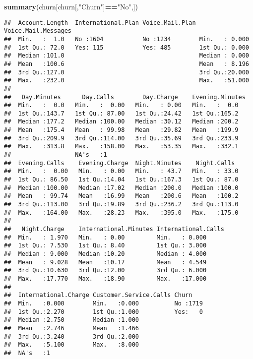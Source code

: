 \documentclass[]{article}
\newenvironment{Shaded}{\begin{snugshade}}{\end{snugshade}}
\newcommand{\KeywordTok}[1]{\textcolor[rgb]{0.13,0.29,0.53}{\textbf{#1}}}
\newcommand{\NormalTok}[1]{#1}
\newcommand{\OperatorTok}[1]{\textcolor[rgb]{0.81,0.36,0.00}{\textbf{#1}}}
\newcommand{\StringTok}[1]{\textcolor[rgb]{0.31,0.60,0.02}{#1}}
\begin{document}
\begin{Shaded}
\begin{Highlighting}[]
\KeywordTok{summary}\NormalTok{(churn[churn[,}\StringTok{"Churn"}\NormalTok{]}\OperatorTok{==}\StringTok{"No"}\NormalTok{,])}
\end{Highlighting}
\end{Shaded}

\begin{verbatim}
##  Account.Length  International.Plan Voice.Mail.Plan Voice.Mail.Messages
##  Min.   :  1.0   No :1604           No :1234        Min.   : 0.000     
##  1st Qu.: 72.0   Yes: 115           Yes: 485        1st Qu.: 0.000     
##  Median :101.0                                      Median : 0.000     
##  Mean   :100.6                                      Mean   : 8.196     
##  3rd Qu.:127.0                                      3rd Qu.:20.000     
##  Max.   :232.0                                      Max.   :51.000     
##                                                                        
##   Day.Minutes      Day.Calls        Day.Charge    Evening.Minutes
##  Min.   :  0.0   Min.   :  0.00   Min.   : 0.00   Min.   :  0.0  
##  1st Qu.:143.7   1st Qu.: 87.00   1st Qu.:24.42   1st Qu.:165.2  
##  Median :177.2   Median :100.00   Median :30.12   Median :200.2  
##  Mean   :175.4   Mean   : 99.98   Mean   :29.82   Mean   :199.9  
##  3rd Qu.:209.9   3rd Qu.:114.00   3rd Qu.:35.69   3rd Qu.:233.9  
##  Max.   :313.8   Max.   :158.00   Max.   :53.35   Max.   :332.1  
##                  NA's   :1                                       
##  Evening.Calls    Evening.Charge  Night.Minutes    Night.Calls   
##  Min.   :  0.00   Min.   : 0.00   Min.   : 43.7   Min.   : 33.0  
##  1st Qu.: 86.50   1st Qu.:14.04   1st Qu.:167.3   1st Qu.: 87.0  
##  Median :100.00   Median :17.02   Median :200.0   Median :100.0  
##  Mean   : 99.74   Mean   :16.99   Mean   :200.6   Mean   :100.2  
##  3rd Qu.:113.00   3rd Qu.:19.89   3rd Qu.:236.2   3rd Qu.:113.0  
##  Max.   :164.00   Max.   :28.23   Max.   :395.0   Max.   :175.0  
##                                                                  
##   Night.Charge    International.Minutes International.Calls
##  Min.   : 1.970   Min.   : 0.00         Min.   : 0.000     
##  1st Qu.: 7.530   1st Qu.: 8.40         1st Qu.: 3.000     
##  Median : 9.000   Median :10.20         Median : 4.000     
##  Mean   : 9.028   Mean   :10.17         Mean   : 4.549     
##  3rd Qu.:10.630   3rd Qu.:12.00         3rd Qu.: 6.000     
##  Max.   :17.770   Max.   :18.90         Max.   :17.000     
##                                                            
##  International.Charge Customer.Service.Calls Churn     
##  Min.   :0.000        Min.   :0.000          No :1719  
##  1st Qu.:2.270        1st Qu.:1.000          Yes:   0  
##  Median :2.750        Median :1.000                    
##  Mean   :2.746        Mean   :1.466                    
##  3rd Qu.:3.240        3rd Qu.:2.000                    
##  Max.   :5.100        Max.   :8.000                    
##  NA's   :1
\end{verbatim}
\end{document}
